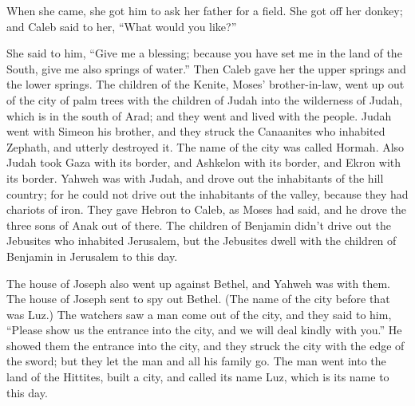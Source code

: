  When she came, she got him to ask her father for a field.
She got off her donkey; and Caleb said to her, ``What would you like?''

 She said to him, ``Give me a blessing; because you have
set me in the land of the South, give me also springs of water.'' Then
Caleb gave her the upper springs and the lower springs. 
The children of the Kenite, Moses' brother-in-law, went up out of the
city of palm trees with the children of Judah into the wilderness of
Judah, which is in the south of Arad; and they went and lived with the
people.  Judah went with Simeon his brother, and they
struck the Canaanites who inhabited Zephath, and utterly destroyed it.
The name of the city was called Hormah.  Also Judah took
Gaza with its border, and Ashkelon with its border, and Ekron with its
border.  Yahweh was with Judah, and drove out the
inhabitants of the hill country; for he could not drive out the
inhabitants of the valley, because they had chariots of iron.
 They gave Hebron to Caleb, as Moses had said, and he drove
the three sons of Anak out of there.  The children of
Benjamin didn't drive out the Jebusites who inhabited Jerusalem, but the
Jebusites dwell with the children of Benjamin in Jerusalem to this day.

 The house of Joseph also went up against Bethel, and
Yahweh was with them.  The house of Joseph sent to spy out
Bethel. (The name of the city before that was Luz.)  The
watchers saw a man come out of the city, and they said to him, ``Please
show us the entrance into the city, and we will deal kindly with you.''
 He showed them the entrance into the city, and they struck
the city with the edge of the sword; but they let the man and all his
family go.  The man went into the land of the Hittites,
built a city, and called its name Luz, which is its name to this day.

